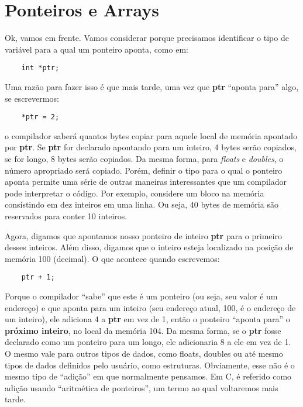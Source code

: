 
\chapter{Ponteiros e Arrays}
Ok, vamos em frente. Vamos considerar porque precisamos identificar o tipo de variável para a qual um ponteiro aponta, como em:
\begin{lstlisting}
	int *ptr;
\end{lstlisting}

Uma razão para fazer isso é que mais tarde, uma vez que \textbf{ptr} ``aponta para'' algo, se escrevermos:
\begin{lstlisting}
	*ptr = 2;
\end{lstlisting}
o compilador saberá quantos bytes copiar para aquele local de memória apontado por \textbf{ptr}. Se \textbf{ptr} for declarado apontando para um inteiro, 4 bytes serão copiados, se for longo, 8 bytes serão copiados. Da mesma forma, para \textit{floats} e \textit{doubles}, o número apropriado será copiado. Porém, definir o tipo para o qual o ponteiro aponta permite uma série de outras maneiras interessantes que um compilador pode interpretar o código. Por exemplo, considere um bloco na memória consistindo em dez inteiros em uma linha. Ou seja, 40 bytes de memória são reservados para conter 10 inteiros.

Agora, digamos que apontamos nosso ponteiro de inteiro \textbf{ptr} para o primeiro desses inteiros. Além disso, digamos que o inteiro esteja localizado na posição de memória 100 (decimal). O que acontece quando escrevemos:
\begin{lstlisting}
	ptr + 1;
\end{lstlisting}

Porque o compilador ``sabe'' que este é um ponteiro (ou seja, seu valor é um endereço) e que aponta para um inteiro (seu endereço atual, 100, é o endereço de um inteiro), ele adiciona 4 a \textbf{ptr} em vez de 1, então o ponteiro ``aponta para'' o \textbf{próximo inteiro}, no local da memória 104. Da mesma forma, se o \textbf{ptr} fosse declarado como um ponteiro para um longo, ele adicionaria 8 a ele em vez de 1.
O mesmo vale para outros tipos de dados, como floats, doubles ou até mesmo tipos de dados definidos pelo usuário, como estruturas. Obviamente, esse não é o mesmo tipo de ``adição'' em que normalmente pensamos. Em C, é referido como adição usando ``aritmética de ponteiros'', um termo ao qual voltaremos mais tarde.

